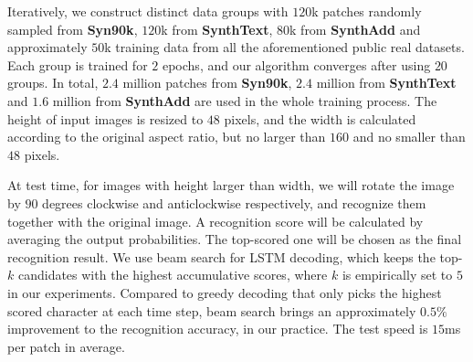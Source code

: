 \documentclass[letterpaper]{article} \usepackage{aaai19}  \usepackage{times}  \usepackage{helvet}  \usepackage{courier}  \usepackage{url}  \usepackage{graphicx}  \usepackage{amsmath}
\begin{document}
Iteratively, we construct distinct data groups with $120$k patches randomly sampled from \textbf{Syn90k}, $120$k from \textbf{SynthText}, $80$k from \textbf{SynthAdd}
and approximately $50$k training data from all the aforementioned public real datasets.
Each group is trained for $2$ epochs, and our algorithm converges after using $20$ groups.
In total, $2.4$ million patches from \textbf{Syn90k}, $2.4$ million from \textbf{SynthText} and $1.6$ million from \textbf{SynthAdd} are used in the whole training process.
The height of input images is resized to $48$ pixels, and the width is calculated according to the original aspect ratio, but no larger than $160$ and no smaller than $48$ pixels.


At test time, for images with height larger than width, we will rotate the image by $90$ degrees clockwise and anticlockwise respectively, and recognize them together with the original image.
A recognition score will be calculated by averaging the output probabilities. The top-scored one will be chosen as the final recognition result.
We use beam search for LSTM decoding, which keeps the top-$k$ candidates with the highest accumulative scores, where $k$ is empirically set to $5$ in our experiments.
Compared to greedy decoding that only picks the highest scored character at each time step,
beam search brings an approximately $0.5\%$ improvement to the recognition accuracy, in our practice.
The test speed is $15$ms per patch in average.
\end{document}
